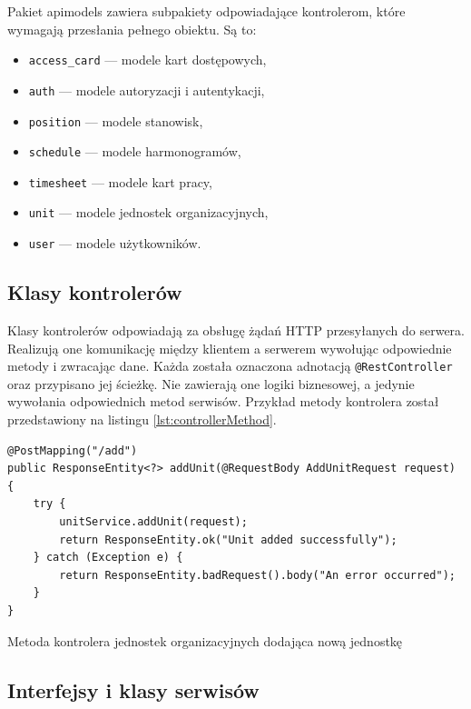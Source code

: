 Pakiet apimodels zawiera subpakiety odpowiadające kontrolerom, które wymagają przesłania pełnego obiektu. Są to:
\begin{itemize}
    \item \texttt{access\_card} --- modele kart dostępowych,
    \item \texttt{auth} --- modele autoryzacji i autentykacji,
    \item \texttt{position} --- modele stanowisk,
    \item \texttt{schedule} --- modele harmonogramów,
    \item \texttt{timesheet} --- modele kart pracy,
    \item \texttt{unit} --- modele jednostek organizacyjnych,
    \item \texttt{user} --- modele użytkowników.
\end{itemize}

\subsection{Klasy kontrolerów}

Klasy kontrolerów odpowiadają za obsługę żądań HTTP przesyłanych do serwera. Realizują one komunikację między klientem a serwerem wywołując odpowiednie metody i zwracając dane. Każda została oznaczona adnotacją \texttt{@RestController} oraz przypisano jej ścieżkę. Nie zawierają one logiki biznesowej, a jedynie wywołania odpowiednich metod serwisów. Przykład metody kontrolera został przedstawiony na listingu \ref{lst:controllerMethod}.

\begin{listing}[H]
    \begin{verbatim}
@PostMapping("/add")
public ResponseEntity<?> addUnit(@RequestBody AddUnitRequest request) {
    try {
        unitService.addUnit(request);
        return ResponseEntity.ok("Unit added successfully");
    } catch (Exception e) {
        return ResponseEntity.badRequest().body("An error occurred");
    }
}
\end{verbatim}
    \caption{Metoda kontrolera jednostek organizacyjnych dodająca nową jednostkę}
    \label{lst:controllerMethod}
\end{listing}

\subsection{Interfejsy i klasy serwisów}

